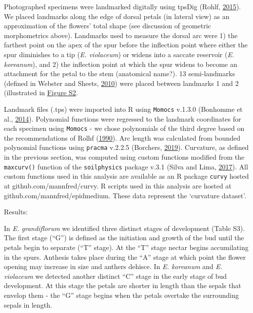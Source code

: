 \documentclass[]{article}
\begin{document}
Photographed specimens were landmarked digitally using tpsDig (Rohlf,
\protect\hyperlink{ref-rohlf_2015}{2015}). We placed landmarks along the
edge of dorsal petals (in lateral view) as an approximation of the
flowers' total shape (see discussion of geometric morphometrics above).
Landmarks used to measure the dorsal arc were 1) the farthest point on
the apex of the spur before the inflection point where either the spur
diminishes to a tip (\emph{E. violaceum}) or widens into a saccate
reservoir (\emph{E. koreanum}), and 2) the inflection point at which the
spur widens to become an attachment for the petal to the stem
(anatomical name?). 13 semi-landmarks (defined in Webster and Sheets,
\protect\hyperlink{ref-webster_2010}{2010}) were placed between
landmarks 1 and 2 (illustrated in \href{Figures/Figure_S2.jpg}{Figure
S2}.

Landmark files (.tps) were imported into R using \texttt{Momocs} v.1.3.0
(Bonhomme et al., \protect\hyperlink{ref-bonhomme_2014}{2014}).
Polynomial functions were regressed to the landmark coordinates for each
specimen using \texttt{Momocs} - we chose polynomials of the third
degree based on the recommendations of Rolhf
(\protect\hyperlink{ref-rohlf_1990}{1990}). Arc length was calculated
from bounded polynomial functions using \texttt{pracma} v.2.2.5
(Borchers, \protect\hyperlink{ref-borchers_2019}{2019}). Curvature, as
defined in the previous section, was computed using custom functions
modified from the \texttt{maxcurv()} function of the
\texttt{soilphysics} package v.3.1 (Silva and Lima,
\protect\hyperlink{ref-silva_2017}{2017}). All custom functions used in
this analysis are available as an R package \texttt{curvy} hosted at
github.com/mannfred/curvy. R scripts used in this analysis are hosted at
github.com/mannfred/epidmedium. These data represent the `curvature
dataset'.

Results:

In \emph{E. grandiflorum} we identified three distinct stages of
development (Table S3). The first stage (``G'') is defined as the
initiation and growth of the bud until the petals begin to separate
(``T'' stage). At the ``T'' stage nectar begins accumilating in the
spurs. Anthesis takes place during the ``A'' stage at which point the
flower opening may increase in size and anthers dehisce. In \emph{E.
koreanum} and \emph{E. violaceum} we detected another distinct ``C''
stage in the early stage of bud development. At this stage the petals
are shorter in length than the sepals that envelop them - the ``G''
stage begins when the petals overtake the surrounding sepals in length.
\end{document}
